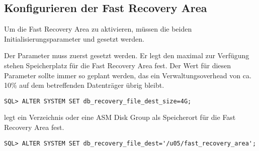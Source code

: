       \subsection{Konfigurieren der Fast Recovery Area}
        Um die Fast Recovery Area zu aktivieren, m\"ussen die beiden Initialisierungsparameter  und  gesetzt werden.
        \begin{merke}
          Der Parameter  muss zuerst gesetzt werden. Er legt den maximal zur Verf\"ugung stehen Speicherplatz f\"ur die Fast Recovery Area fest. Der Wert f\"ur diesen Parameter sollte immer so geplant werden, das ein Verwaltungsoverhead von ca. 10\% auf dem betreffenden Datentr\"ager \"ubrig bleibt.
        \end{merke}
        \begin{lstlisting}[caption={DB\_RECOVERY\_FILE\_DEST\_SIZE setzen},label=admin1033,language=oracle_sql]
SQL> ALTER SYSTEM SET db_recovery_file_dest_size=4G;
        \end{lstlisting}
        \begin{merke}
           legt ein Verzeichnis oder eine ASM Disk Group als Speicherort f\"ur die Fast Recovery Area fest.
        \end{merke}
        \begin{lstlisting}[caption={DB\_RECOVERY\_FILE\_DEST\_SIZE setzen},label=admin1034,language=oracle_sql]
SQL> ALTER SYSTEM SET db_recovery_file_dest='/u05/fast_recovery_area';
        \end{lstlisting}
